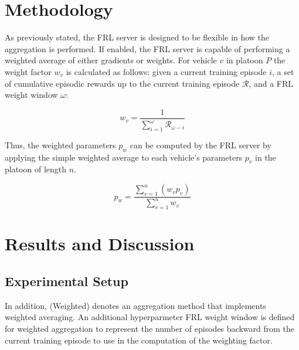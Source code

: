 \chapter{Methodology}
As previously stated, the FRL server is designed to be flexible in how the aggregation is performed. If enabled, the FRL server is capable of performing a weighted average of either gradients or weights. For vehicle $v$ in platoon $P$ the weight factor $w_v$ is calculated as follows: given a current training episode $i$, a set of cumulative episodic rewards up to the current training episode $\mathcal{R}$, and a FRL weight window $\omega$:

\begin{equation}
   w_v = \dfrac{1}{\sum_{i=1}^{\omega} \mathcal{R}_{\omega-i}}
\end{equation}

Thus, the weighted parameters $p_w$ can be computed by the FRL server by applying the simple weighted average to each vehicle's parameters $p_v$ in the platoon of length $n$.

\begin{equation}
    p_w = \dfrac{\sum_{v=1}^{n} (w_{v} p_v)}{\sum_{v=1}^n w_{v}}
\end{equation}

\chapter{Results and Discussion}
\section{Experimental Setup}

In addition, (Weighted) denotes an aggregation method that implements weighted averaging. An additional hyperparmeter FRL weight window is defined for weighted aggregation to represent the number of episodes backward from the current training episode to use in the computation of the weighting factor.